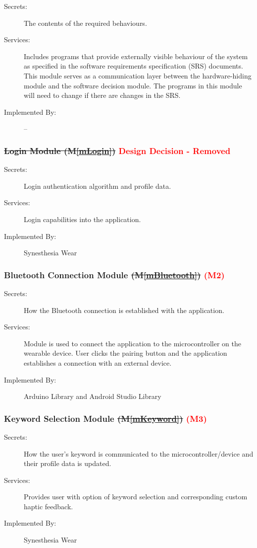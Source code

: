 \documentclass[12pt, titlepage]{article}
\newcommand{\mref}[1]{M\ref{#1}}
\begin{document}
\begin{description}
\item[Secrets:]The contents of the required behaviours.
\item[Services:]Includes programs that provide externally visible behaviour of
  the system as specified in the software requirements specification (SRS)
  documents. This module serves as a communication layer between the
  hardware-hiding module and the software decision module. The programs in this
  module will need to change if there are changes in the SRS.
\item[Implemented By:] --
\end{description}

\subsubsection{\sout{Login Module (\mref{mLogin})} \textcolor{red}{Design Decision - Removed}}
\begin{description}
\item[Secrets:] Login authentication algorithm and profile data. 
\item[Services:] Login capabilities into the application.
\item[Implemented By:] Synesthesia Wear
\end{description}

\subsubsection{Bluetooth Connection Module \sout{(\mref{mBluetooth})} \textcolor{red}{(M2)}}
\begin{description}
  \item[Secrets:] How the Bluetooth connection is established with the application.
  \item[Services:] Module is used to connect the application to the microcontroller on the wearable device. User clicks the pairing button and the application establishes a connection with an external device.
  \item[Implemented By:] Arduino Library and Android Studio Library
  \end{description}

\subsubsection{Keyword Selection Module \sout{(\mref{mKeyword})} \textcolor{red}{(M3)}}
\begin{description}
  \item[Secrets:] How the user’s keyword is communicated to the microcontroller/device and their profile data is updated.
  \item[Services:] Provides user with option of keyword selection and corresponding custom haptic feedback.
  \item[Implemented By:] Synesthesia Wear
  \end{description}
\end{document}
